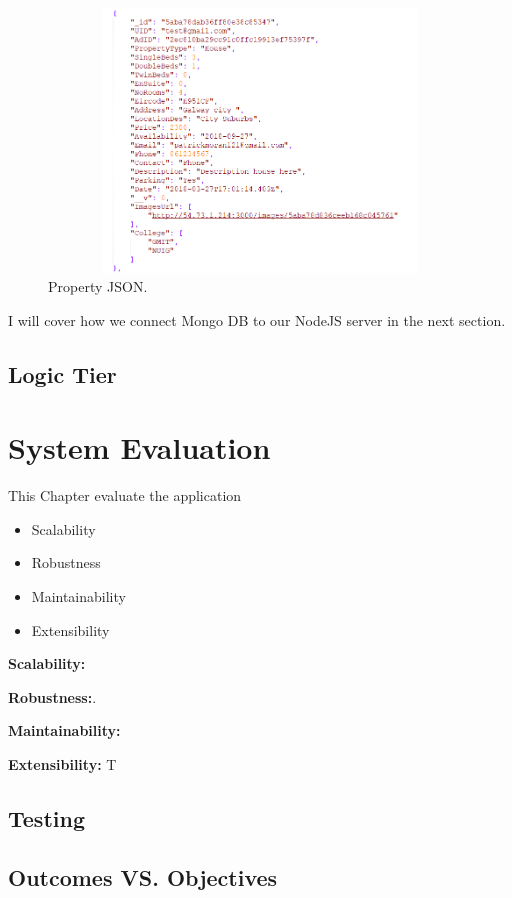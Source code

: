 \begin{figure}[h]
\centering
\includegraphics[width=14cm, height=7cm]{img/JSON.PNG}
\caption{Property JSON.}
\end{figure}

I will cover how we connect Mongo DB to our NodeJS server in the next section.

\section{Logic Tier}




\chapter{System Evaluation}
This Chapter evaluate the application
\begin{itemize}
    \item Scalability
    \item Robustness
    \item Maintainability
    \item Extensibility
\end{itemize}

\par \textbf{Scalability:} 

\par \textbf{Robustness:}.

\par \textbf{Maintainability:}

\par \textbf{Extensibility:} T

\section{Testing}

\section{Outcomes VS. Objectives}


